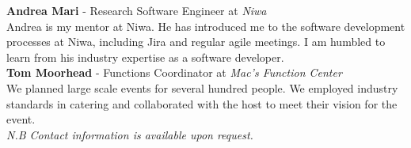 \documentclass[9pt]{developercv}
\begin{document}

\textbf{Andrea Mari} - Research Software Engineer at \emph{Niwa} \\
Andrea is my mentor at Niwa. He has introduced me to the software development processes at Niwa, including Jira and regular agile meetings. I am humbled to learn from his industry expertise as a software developer.\\

\textbf{Tom Moorhead} - Functions Coordinator at \emph{Mac's Function Center} \\
We planned large scale events for several hundred people. We employed industry standards in catering and collaborated with the host to meet their vision for the event. \\

\emph{N.B Contact information is available upon request.}



\end{document}
